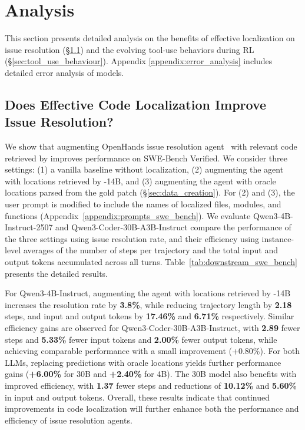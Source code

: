 \section{Analysis}
This section presents detailed analysis on the benefits of effective localization on issue resolution (\S\ref{sec:downstream_swebench}) and the evolving tool-use behaviors during RL (\S\ref{sec:tool_use_behaviour}). Appendix \ref{appendix:error_analysis} includes detailed error analysis of \methodname models.

\subsection{Does Effective Code Localization Improve Issue Resolution?}\label{sec:downstream_swebench}

% 
We show that augmenting OpenHands issue resolution agent~\citep{wang2025openhandssoftwareagentsdk} with relevant code retrieved by \methodname improves performance on SWE-Bench Verified. We consider three settings: (1) a vanilla baseline without localization, (2) augmenting the agent with locations retrieved by \methodname-14B, and (3) augmenting the agent with oracle locations parsed from the gold patch (\S\ref{sec:data_creation}). 
For (2) and (3), the user prompt is modified to include the names of localized files, modules, and functions (Appendix~\ref{appendix:prompts_swe_bench}). We evaluate Qwen3-4B-Instruct-2507 and Qwen3-Coder-30B-A3B-Instruct compare the performance of the three settings using issue resolution rate, and their efficiency using instance-level averages of the number of steps per trajectory and the total input and output tokens accumulated across all turns. Table~\ref{tab:downstream_swe_bench} presents the detailed results.

For Qwen3-4B-Instruct, augmenting the agent with locations retrieved by \methodname-14B increases the resolution rate by \textbf{3.8\%}, while reducing trajectory length by \textbf{2.18} steps, and input and output tokens by \textbf{17.46\%} and \textbf{6.71\%} respectively. Similar efficiency gains are observed for Qwen3-Coder-30B-A3B-Instruct, with \textbf{2.89} fewer steps and \textbf{5.33\%} fewer input tokens and \textbf{2.00\%} fewer output tokens, while achieving comparable performance with a small improvement (+0.80\%). For both LLMs, replacing \methodname predictions with oracle locations yields further performance gains (\textbf{+6.00\%} for 30B and \textbf{+2.40\%} for 4B). The 30B model also benefits with improved efficiency, with \textbf{1.37} fewer steps and reductions of \textbf{10.12\%} and \textbf{5.60\%} in input and output tokens. Overall, these results indicate that continued improvements in code localization will further enhance both the performance and efficiency of issue resolution agents.

